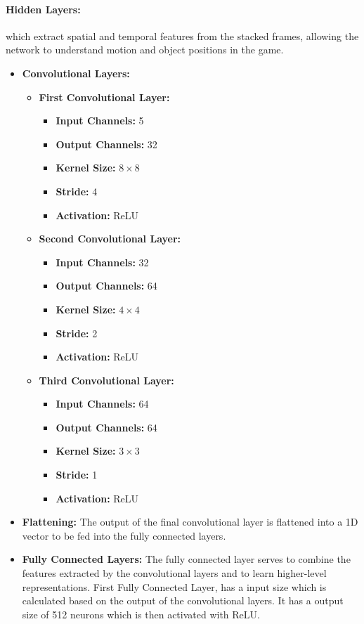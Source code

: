 \documentclass[
12pt, %
oneside, %
english, %
onehalfspacing, %
nolistspacing, %
liststotoc, %
headsepline, %
]{ProposalAndThesis} %
\begin{document}
\paragraph{Hidden Layers:} which extract spatial and temporal features from the stacked frames, allowing the network to understand motion and object positions in the game.
\begin{itemize}
    \item \textbf{Convolutional Layers:}
    \begin{itemize}
        \item \textbf{First Convolutional Layer:}
        \begin{itemize}
            \item \textbf{Input Channels:} 5
            \item \textbf{Output Channels:} 32
            \item \textbf{Kernel Size:} \(8 \times 8\)
            \item \textbf{Stride:} 4
            \item \textbf{Activation:} ReLU
        \end{itemize}
        \item \textbf{Second Convolutional Layer:}
        \begin{itemize}
            \item \textbf{Input Channels:} 32
            \item \textbf{Output Channels:} 64
            \item \textbf{Kernel Size:} \(4 \times 4\)
            \item \textbf{Stride:} 2
            \item \textbf{Activation:} ReLU
        \end{itemize}
        \item \textbf{Third Convolutional Layer:}
        \begin{itemize}
            \item \textbf{Input Channels:} 64
            \item \textbf{Output Channels:} 64
            \item \textbf{Kernel Size:} \(3 \times 3\)
            \item \textbf{Stride:} 1
            \item \textbf{Activation:} ReLU
        \end{itemize}
    \end{itemize}
    \item \textbf{Flattening:} The output of the final convolutional layer is flattened into a 1D vector to be fed into the fully connected layers.
    \item \textbf{Fully Connected Layers:} The fully connected layer serves to combine the features extracted by the convolutional layers and to learn higher-level representations. First Fully Connected Layer, has a input size which is calculated based on the output of the convolutional layers. It has a output size of 512 neurons which is then activated with ReLU.
\end{itemize}
\end{document}
